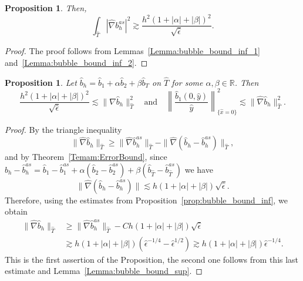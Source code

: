 \documentclass{article}
\newtheorem{propo}[thm]{Proposition}
\newcommand{\rz}{\mathbb{R}}
\newcommand{\hatT}{\ensuremath{{\hat{T}}}}
\newcommand{\hatb}{\ensuremath{\hat{b}}}
\newcommand{\haty}{\ensuremath{{\hat{y}}}}
\newcommand{\hatN}{\ensuremath{\hat{\nabla}}}
\begin{document}
\begin{appendix}
\begin{propo}
Then,
\begin{equation*}
\int_\hatT|\hatN b_h^{as}|^2 \gtrsim
\frac{h^2(1+|\alpha|+|\beta|)^2}{\sqrt{\hat{\epsilon}}}.
\end{equation*}  
\end{propo}
\begin{proof}
The proof follows from Lemmas~\ref{Lemma:bubble_bound_inf_1} and~\ref{Lemma:bubble_bound_inf_2}. 
\end{proof}
\begin{propo}\label{propo: bh_inf_bound}
  Let $\hatb_h= \hatb_1 + \alpha \hatb_2 + \beta \hatb_T$ on $\hatT$ for some $\alpha,\beta\in \rz$. Then
  \begin{equation*}
  \frac{h^2(1+|\alpha|+|\beta|)^2}{\sqrt{\hat{\epsilon}}}
  \lesssim \|\hatN \hatb_h \|_\hatT^2 
  \quad\text{and}\quad
      \left\| \frac{\hat{b}_1(0,\haty)}{\haty} \right\|_{\{\hat{x}=0\}}^2 \lesssim
      \|\hatN \hatb_h \|_\hatT^2.
  \end{equation*}
\end{propo}

\begin{proof}
By the triangle inequality
\begin{equation*}
    \|\hatN \hatb_h \|_\hatT \ge \|\hatN \hatb_h^{as} \|_\hatT
    - \|\hatN (\hatb_h - \hatb_h^{as})\|_\hatT,
\end{equation*}
and by Theorem~\ref{Temam:ErrorBound}, since
$\hatb_h - \hatb_h^{as}  = \hatb_1-\hatb_1^{as} + \alpha(\hatb_2- \hatb_2^{as}) + \beta (\hatb_\hatT-\hatb_\hatT^{as})$ we have
\begin{equation*}
    \|\hatN (\hatb_h - \hatb_h^{as})\|
    \lesssim h(1+|\alpha|+|\beta|)\sqrt{\hat{\epsilon}}
   .
\end{equation*}
Therefore, using the estimates from Proposition~\ref{prop:bubble_bound_inf}, we obtain
\begin{equation*}
\label{eq:grad_bh_inf}
\begin{split}
    \|\hatN \hatb_h \|_\hatT &\ge \|\hatN \hatb_h^{as} \|_\hatT
    -C h(1+|\alpha|+|\beta|)\sqrt{\hat{\epsilon}}
    \\
    &\gtrsim
    h(1+|\alpha|+|\beta|) (
    \hat{\epsilon}^{-1/4} - \hat{\epsilon}^{1/2} )
   \gtrsim h(1+|\alpha|+|\beta|)\hat{\epsilon}^{-1/4}.
    \end{split}
\end{equation*}
This is the first assertion of the Proposition, the second one follows from this last estimate and Lemma~\ref{Lemma:bubble_bound_sup}.
\end{proof}



\end{appendix}
\end{document}
